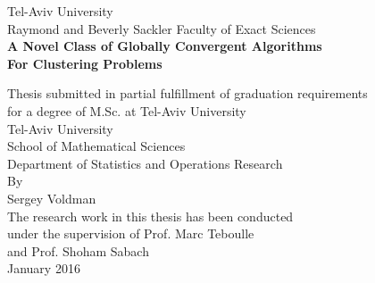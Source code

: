 
 \thispagestyle{empty}

\vspace{3cm}
\begin{center}
Tel-Aviv University\\
Raymond and Beverly Sackler Faculty of Exact Sciences\\
\vspace{2.5cm} {\bf A Novel Class of Globally Convergent Algorithms\\ For Clustering Problems}\\
 \vspace{2.5cm}

Thesis submitted in partial fulfillment of graduation requirements\\
for a degree of M.Sc. at Tel-Aviv University\\
\vspace{2cm}
Tel-Aviv University\\
School of Mathematical Sciences\\
Department of Statistics and Operations Research\\
\vspace{2cm}
By\\
Sergey Voldman\\
\vspace{2cm}
The research work in this thesis has been conducted\\
under the supervision of Prof. Marc Teboulle\\
and Prof. Shoham Sabach\\
\vspace{2cm}
January 2016\\
\end{center}

\nobreak
